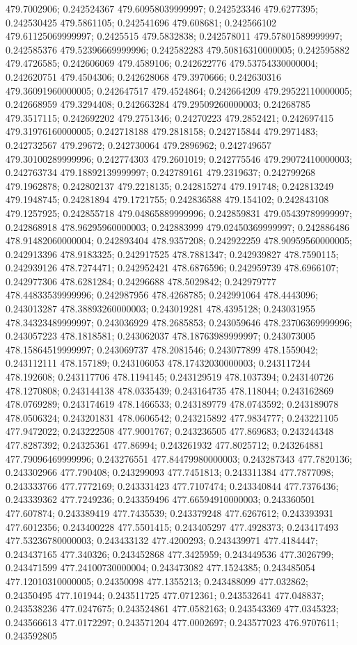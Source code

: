 479.7002906; 0.242524367 479.60958039999997; 0.242523346 479.6277395; 0.242530425 479.5861105; 0.242541696 479.608681; 0.242566102 479.61125069999997; 0.2425515 479.5832838; 0.242578011 479.57801589999997; 0.242585376 479.52396669999996; 0.242582283 479.50816310000005; 0.242595882 479.4726585; 0.242606069 479.4589106; 0.242622776 479.53754330000004; 0.242620751 479.4504306; 0.242628068 479.3970666; 0.242630316 479.36091960000005; 0.242647517 479.4524864; 0.242664209 479.29522110000005; 0.242668959 479.3294408; 0.242663284 479.29509260000003; 0.24268785 479.3517115; 0.242692202 479.2751346; 0.24270223 479.2852421; 0.242697415 479.31976160000005; 0.242718188 479.2818158; 0.242715844 479.2971483; 0.242732567 479.29672; 0.242730064 479.2896962; 0.242749657 479.30100289999996; 0.242774303 479.2601019; 0.242775546 479.29072410000003; 0.242763734 479.18892139999997; 0.242789161 479.2319637; 0.242799268 479.1962878; 0.242802137 479.2218135; 0.242815274 479.191748; 0.242813249 479.1948745; 0.24281894 479.1721755; 0.242836588 479.154102; 0.242843108 479.1257925; 0.242855718 479.04865889999996; 0.242859831 479.05439789999997; 0.242868918 478.96295960000003; 0.242883999 479.02450369999997; 0.242886486 478.91482060000004; 0.242893404 478.9357208; 0.242922259 478.90959560000005; 0.242913396 478.9183325; 0.242917525 478.7881347; 0.242939827 478.7590115; 0.242939126 478.7274471; 0.242952421 478.6876596; 0.242959739 478.6966107; 0.242977306 478.6281284; 0.24296688 478.5029842; 0.242979777 478.44833539999996; 0.242987956 478.4268785; 0.242991064 478.4443096; 0.243013287 478.38893260000003; 0.243019281 478.4395128; 0.243031955 478.34323489999997; 0.243036929 478.2685853; 0.243059646 478.23706369999996; 0.243057223 478.1818581; 0.243062037 478.18763989999997; 0.243073005 478.15864519999997; 0.243069737 478.2081546; 0.243077899 478.1559042; 0.243112111 478.157189; 0.243106053 478.17432030000003; 0.243117244 478.192608; 0.243117706 478.1194145; 0.243129519 478.1037394; 0.243140726 478.1270808; 0.243144138 478.0335439; 0.243164735 478.118044; 0.243162869 478.0769289; 0.243174619 478.1466533; 0.243189779 478.0743592; 0.243189078 478.0506324; 0.243201831 478.0606542; 0.243215892 477.9834777; 0.243221105 477.9472022; 0.243222508 477.9001767; 0.243236505 477.869683; 0.243244348 477.8287392; 0.24325361 477.86994; 0.243261932 477.8025712; 0.243264881 477.79096469999996; 0.243276551 477.84479980000003; 0.243287343 477.7820136; 0.243302966 477.790408; 0.243299093 477.7451813; 0.243311384 477.7877098; 0.243333766 477.7772169; 0.243331423 477.7107474; 0.243340844 477.7376436; 0.243339362 477.7249236; 0.243359496 477.66594910000003; 0.243360501 477.607874; 0.243389419 477.7435539; 0.243379248 477.6267612; 0.243393931 477.6012356; 0.243400228 477.5501415; 0.243405297 477.4928373; 0.243417493 477.53236780000003; 0.243433132 477.4200293; 0.243439971 477.4184447; 0.243437165 477.340326; 0.243452868 477.3425959; 0.243449536 477.3026799; 0.243471599 477.24100730000004; 0.243473082 477.1524385; 0.243485054 477.12010310000005; 0.24350098 477.1355213; 0.243488099 477.032862; 0.24350495 477.101944; 0.243511725 477.0712361; 0.243532641 477.048837; 0.243538236 477.0247675; 0.243524861 477.0582163; 0.243543369 477.0345323; 0.243566613 477.0172297; 0.243571204 477.0002697; 0.243577023 476.9707611; 0.243592805 